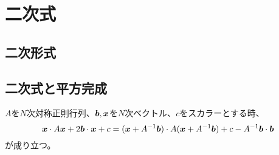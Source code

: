 
\chapter{二次式}

\section{二次形式}

\section{二次式と平方完成}

\begin{theorem}[平方完成]
$A$を$N$次対称正則行列、$\vb*{b}, \vb*{x}$を$N$次ベクトル、$c$をスカラーとする時、
$$
\vb*{x}\cdot A\vb*{x}+2\vb*{b}\cdot\vb*{x}+c
= (\vb*{x}+A^{-1}\vb*{b})\cdot A(\vb*{x}+A^{-1}\vb*{b})+c-A^{-1}\vb*{b}\cdot\vb*{b}
$$
が成り立つ。
\end{theorem}

